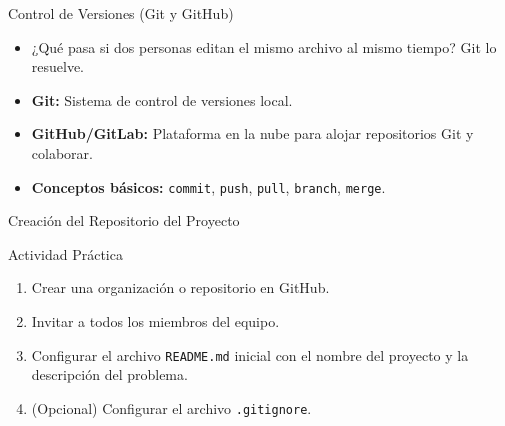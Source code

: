 \documentclass{beamer}
\begin{document}
\begin{frame}{Control de Versiones (Git y GitHub)}
    \begin{itemize}
        \item ¿Qué pasa si dos personas editan el mismo archivo al mismo tiempo? Git lo resuelve.
        \item \textbf{Git:} Sistema de control de versiones local.
        \item \textbf{GitHub/GitLab:} Plataforma en la nube para alojar repositorios Git y colaborar.
        \item \textbf{Conceptos básicos:} \texttt{commit}, \texttt{push}, \texttt{pull}, \texttt{branch}, \texttt{merge}.
    \end{itemize}
\end{frame}

\begin{frame}{Creación del Repositorio del Proyecto}
    \begin{block}{Actividad Práctica}
        \begin{enumerate}
            \item Crear una organización o repositorio en GitHub.
            \item Invitar a todos los miembros del equipo.
            \item Configurar el archivo \texttt{README.md} inicial con el nombre del proyecto y la descripción del problema.
            \item (Opcional) Configurar el archivo \texttt{.gitignore}.
        \end{enumerate}
    \end{block}
\end{frame}
\end{document}
